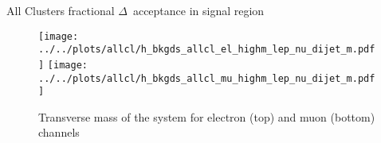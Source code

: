 \documentclass{article}
\begin{document}
\begin{table}[htbp]
  \centering
  \caption{All Clusters fractional $\Delta$~acceptance in signal region}
\end{table}


\begin{figure}[h]
  \centering
  \texttt{[image: ../../plots/allcl/h\_bkgds\_allcl\_el\_highm\_lep\_nu\_dijet\_m.pdf]}
  \texttt{[image: ../../plots/allcl/h\_bkgds\_allcl\_mu\_highm\_lep\_nu\_dijet\_m.pdf]}
  
  \caption{Transverse mass of the system for electron (top) and muon (bottom) channels}
\end{figure}
\end{document}
